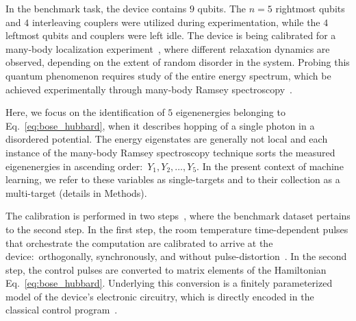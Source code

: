 \documentclass[aps,twocolumn,superscriptaddress,floatfix,preprintnumbers,showkeys]{revtex4}
\begin{document}
In the benchmark task, the device contains $9$ qubits. The $n=5$ rightmost qubits and $4$ interleaving couplers were utilized during experimentation, while the $4$ leftmost qubits and couplers were left idle. The device is being calibrated for a many-body localization experiment~\cite{Roushan_2017, Chiaro_2019}, where different relaxation dynamics are observed, depending on the extent of random disorder in the system. Probing this quantum phenomenon requires study of the entire energy spectrum, which be achieved experimentally through many-body Ramsey spectroscopy~\cite{Roushan_2017}. 

Here, we focus on the identification of $5$ eigenenergies belonging to Eq.~\ref{eq:bose_hubbard}, when it describes hopping of a single photon in a disordered potential. The energy eigenstates are generally not local and each instance of the many-body Ramsey spectroscopy technique sorts the measured eigenenergies in ascending order:\ $Y_{1}, Y_{2},\dots,Y_{5}.$ In the present context of machine learning, we refer to these variables as single-targets and to their collection as a multi-target (details in Methods). 

The calibration is performed in two steps~\cite{Roushan_2017, Neill_2018, Chiaro_2019}, where the benchmark dataset pertains to the second step. In the first step, the room temperature time-dependent pulses that orchestrate the computation are calibrated to arrive at the device:\ orthogonally, synchronously, and without pulse-distortion~\cite{Neill_2018}. In the second step, the control pulses are converted to matrix elements of the Hamiltonian Eq.~\ref{eq:bose_hubbard}. Underlying this conversion is a finitely parameterized model of the device's electronic circuitry, which is directly encoded in the classical control program~\cite{Roushan_2017, Neill_2018, Chiaro_2019}. 
\end{document}
